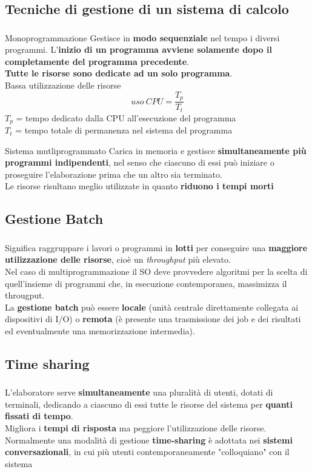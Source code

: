 \documentclass{beamer}
\newenvironment{mainframe}{
	\begin{frame}
		\frametitle{\insertsubsection}
		\framesubtitle{\insertsection}
	}{
	\end{frame}
}
\begin{document}
\subsection{Tecniche di gestione di un sistema di calcolo}
\begin{mainframe}
	\begin{block}{Monoprogrammazione}
		Gestisce in \textbf{modo sequenziale} nel tempo i diversi programmi. L'\textbf{inizio di un programma avviene solamente dopo il completamente del programma precedente}.\\
		\textbf{Tutte le risorse sono dedicate ad un solo programma}.\\
		Bassa utilizzazione delle risorse
		$$uso \ CPU = \frac{T_p}{T_t}$$
		$T_p$ = tempo dedicato dalla CPU all'esecuzione del programma\\
		$T_t$ = tempo totale di permanenza nel sistema del programma
	\end{block}
\end{mainframe}
\begin{frame}
	\begin{block}{Sistema mutliprogrammato}
		Carica in memoria e gestisce \textbf{simultaneamente più programmi indipendenti}, nel senso che ciascuno di essi può iniziare o proseguire l'elaborazione prima che un altro sia terminato.\\
		Le risorse risultano meglio utilizzate in quanto \textbf{riduono i tempi morti}
	\end{block}
\end{frame}
\subsection{Gestione Batch}
\begin{mainframe}
	Significa raggruppare i lavori o programmi in \textbf{lotti} per conseguire una \textbf{maggiore utilizzazione delle risorse}, cioè un \textit{throughput} più elevato.\\
	Nel caso di multiprogrammazione il SO deve provvedere algoritmi per la scelta di quell'insieme di programmi che, in esecuzione contemporanea, massimizza il througput.\\
	La \textbf{gestione batch} può essere \textbf{locale} (unità centrale direttamente collegata ai dispositivi di I/O) o \textbf{remota} (è presente una trasmissione dei job e dei risultati ed eventualmente una memorizzazione intermedia).
\end{mainframe}
\subsection{Time sharing}
\begin{mainframe}
	L'elaboratore serve \textbf{simultaneamente} una pluralità di utenti, dotati di terminali, dedicando a ciascuno di essi tutte le risorse del sistema per \textbf{quanti fissati di tempo}.\\
	Migliora i \textbf{tempi di risposta} ma peggiore l'utilizzazione delle risorse.\\
	Normalmente una modalità di gestione \textbf{time-sharing} è adottata nei \textbf{sistemi conversazionali}, in cui più utenti contemporaneamente "colloquiano" con il sistema
\end{mainframe}
\end{document}
